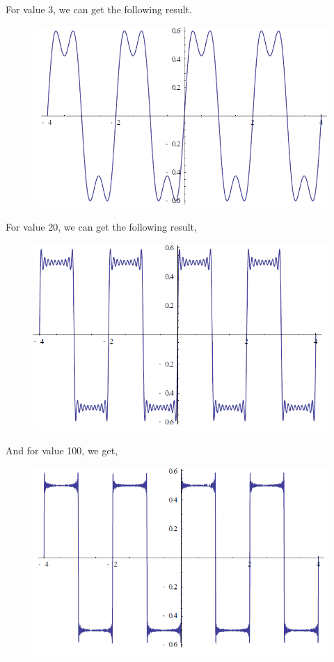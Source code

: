 \documentclass{article}
\begin{document}
For value 3, we can get the following result.
\begin{figure}[H]\centering
    \includegraphics[scale=1.0]{value3.png}
\end{figure}
For value 20, we can get the following result,
\begin{figure}[H]\centering
    \includegraphics[scale=1.0]{value20.png}
\end{figure}
And for value 100, we get,
\begin{figure}[H]\centering
    \includegraphics[scale=1.0]{value100.png}
\end{figure}
\end{document}
